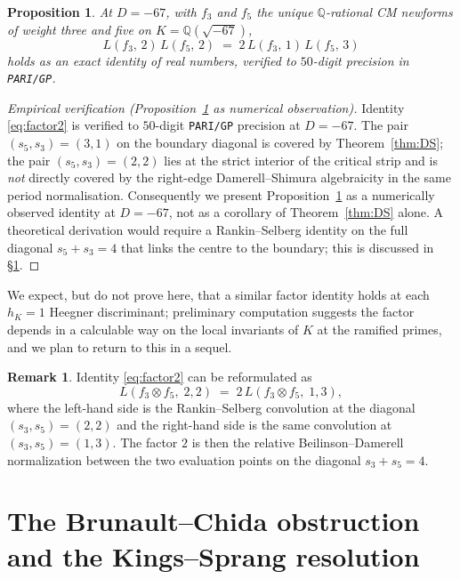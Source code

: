 \documentclass[11pt,a4paper]{amsart}
\theoremstyle{plain}
\newtheorem{proposition}[theorem]{Proposition}
\theoremstyle{definition}
\newtheorem{remark}[theorem]{Remark}
\newcommand{\Q}{\mathbb{Q}}
\begin{document}
\begin{proposition}
\label{prop:factor2}
At $D=-67$, with $f_3$ and $f_5$ the unique $\Q$-rational CM newforms of
weight three and five on $K=\Q(\sqrt{-67})$,
\begin{equation}
\label{eq:factor2}
  L(f_3,\,2)\,L(f_5,\,2)
  \;=\;
  2\,L(f_3,\,1)\,L(f_5,\,3)
\end{equation}
holds as an exact identity of real numbers, verified to $50$-digit
precision in \texttt{PARI/GP}.
\end{proposition}

\begin{proof}[Empirical verification (Proposition~\ref{prop:factor2} as
numerical observation)]
Identity \eqref{eq:factor2} is verified to $50$-digit \texttt{PARI/GP}
precision at $D=-67$. The pair $(s_5,s_3)=(3,1)$ on the boundary
diagonal is covered by Theorem~\ref{thm:DS}; the pair $(s_5,s_3)=(2,2)$
lies at the strict interior of the critical strip and is \emph{not}
directly covered by the right-edge Damerell--Shimura algebraicity in
the same period normalisation. Consequently we present
Proposition~\ref{prop:factor2} as a numerically observed identity at
$D=-67$, not as a corollary of Theorem~\ref{thm:DS} alone. A
theoretical derivation would require a Rankin--Selberg identity on
the full diagonal $s_5+s_3=4$ that links the centre to the boundary;
this is discussed in \S\ref{sec:open}.
\end{proof}

We expect, but do not prove here, that a similar factor identity holds at
each $h_K=1$ Heegner discriminant; preliminary computation suggests the
factor depends in a calculable way on the local invariants of $K$ at the
ramified primes, and we plan to return to this in a sequel.

\begin{remark}
\label{rem:RS}
Identity \eqref{eq:factor2} can be reformulated as
\[
  L(f_3\otimes f_5,\;2,2) \;=\; 2\,L(f_3\otimes f_5,\;1,3),
\]
where the left-hand side is the Rankin--Selberg convolution at the
diagonal $(s_3,s_5)=(2,2)$ and the right-hand side is the same
convolution at $(s_3,s_5)=(1,3)$. The factor $2$ is then the relative
Beilinson--Damerell normalization between the two evaluation points on
the diagonal $s_3+s_5=4$.
\end{remark}

\section{The Brunault--Chida obstruction and the Kings--Sprang resolution}
\label{sec:open}
\end{document}
